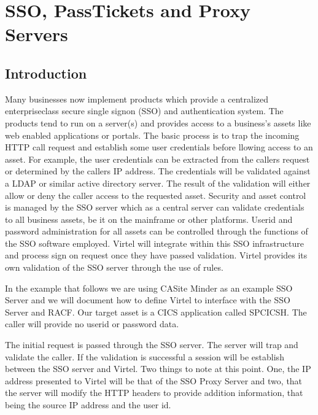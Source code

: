 \documentclass[letterpaper,10pt,english]{sphinxmanual}
\begin{document}
\chapter{SSO, PassTickets and Proxy Servers}
\label{\detokenize{connectivity_guide:sso-passtickets-and-proxy-servers}}

\section{Introduction}
\label{\detokenize{connectivity_guide:id76}}
\sphinxAtStartPar
Many businesses now implement products which provide a centralized enterprise\sphinxhyphen{}class secure single sign\sphinxhyphen{}on (SSO) and authentication system. The products tend to run on a server(s) and provides access to a business’s assets like web enabled applications or portals. The basic process is to trap the incoming HTTP call request and establish some user credentials before llowing access to an asset. For example, the user credentials can be extracted from the callers request or determined by the callers IP address. The credentials will be validated against a LDAP or similar active directory server. The result of the validation will either allow or deny the caller access to the requested asset. Security and asset control is managed by the SSO server which as a central server can validate credentials to all business assets, be it on the mainframe or other platforms. Userid and password administration for all assets can be controlled through the functions of the SSO software employed. Virtel will integrate within this SSO infrastructure and process sign on request once they have passed validation. Virtel provides its own validation of the SSO server through the use of rules.

\sphinxAtStartPar
In the example that follows we are using CA\sphinxhyphen{}Site Minder as an example SSO Server and we will document how to define Virtel to interface with the SSO Server and RACF. Our target asset is a CICS application called SPCICSH. The caller will provide no userid or password data.

\sphinxAtStartPar
{} 

\sphinxAtStartPar
The initial request is passed through the SSO server. The server will trap and validate the caller. If the validation is successful a session will be establish between the SSO server and Virtel. Two things to note at this point. One, the IP address presented to Virtel will be that of the SSO Proxy Server and two, that the server will modify the HTTP headers to provide addition information, that being the source IP address and the user id.
\end{document}
